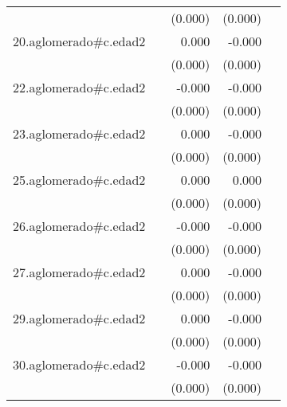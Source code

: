 {\begin{longtable}{l*{4}{D{.}{.}{-1}}}
            &                     &     (0.000)         &     (0.000)         &                     \\
\addlinespace
20.aglomerado#c.edad2&                     &       0.000         &      -0.000         &                     \\
            &                     &     (0.000)         &     (0.000)         &                     \\
\addlinespace
22.aglomerado#c.edad2&                     &      -0.000         &      -0.000         &                     \\
            &                     &     (0.000)         &     (0.000)         &                     \\
\addlinespace
23.aglomerado#c.edad2&                     &       0.000         &      -0.000         &                     \\
            &                     &     (0.000)         &     (0.000)         &                     \\
\addlinespace
25.aglomerado#c.edad2&                     &       0.000         &       0.000         &                     \\
            &                     &     (0.000)         &     (0.000)         &                     \\
\addlinespace
26.aglomerado#c.edad2&                     &      -0.000         &      -0.000         &                     \\
            &                     &     (0.000)         &     (0.000)         &                     \\
\addlinespace
27.aglomerado#c.edad2&                     &       0.000         &      -0.000         &                     \\
            &                     &     (0.000)         &     (0.000)         &                     \\
\addlinespace
29.aglomerado#c.edad2&                     &       0.000         &      -0.000         &                     \\
            &                     &     (0.000)         &     (0.000)         &                     \\
\addlinespace
30.aglomerado#c.edad2&                     &      -0.000         &      -0.000\sym{***}&                     \\
            &                     &     (0.000)         &     (0.000)         &                     \\

\end{longtable}}
